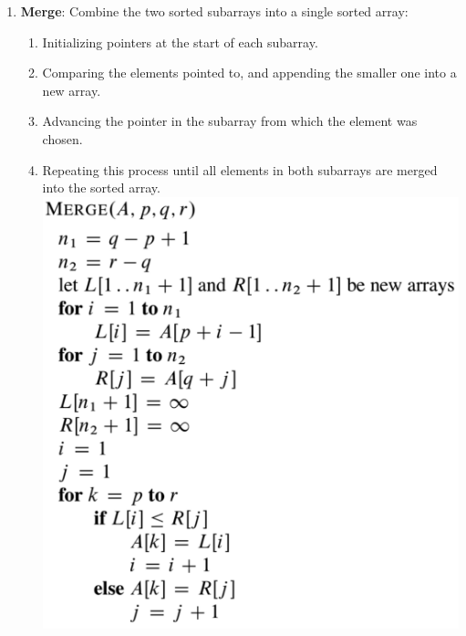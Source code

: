\documentclass[5pt]{extarticle}
\begin{document}
{{{\begin{enumerate}[noitemsep]
        \item \textbf{Merge}: Combine the two sorted subarrays into a single sorted array:
        \begin{enumerate}[noitemsep]
            \item Initializing pointers at the start of each subarray.
            \item Comparing the elements pointed to, and appending the smaller one into a new array.
            \item Advancing the pointer in the subarray from which the element was chosen.
            \item Repeating this process until all elements in both subarrays are merged into the sorted array.
 \includegraphics[width=0.6\linewidth]{images/merge.png}


\end{enumerate}
\end{enumerate}}}}
\end{document}
